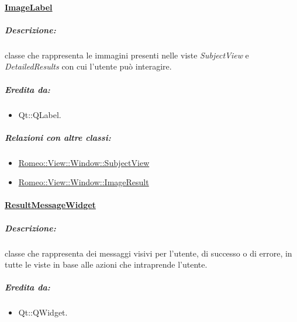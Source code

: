 	\paragraph{\underline{ImageLabel}}
			\label{nav} 
				\subparagraph{Descrizione:} classe che rappresenta le immagini presenti nelle viste \textit{SubjectView} e \textit{DetailedResults} con cui l'utente può interagire.
				
				\subparagraph{Eredita da:}
					\begin{itemize}
					\item Qt::QLabel.
					\end{itemize}
				\subparagraph{Relazioni con altre classi:}
					\begin{itemize}
						\item \hyperref[mainview]{Romeo::View::Window::SubjectView} 
						\item \hyperref[mainview]{Romeo::View::Window::ImageResult} 
					\end{itemize}
					
	\paragraph{\underline{ResultMessageWidget}}
				\label{nav} 
					\subparagraph{Descrizione:} classe che rappresenta dei messaggi visivi per l'utente, di successo o di errore, in tutte le viste in base alle azioni che intraprende l'utente.
					
					\subparagraph{Eredita da:}
						\begin{itemize}
						\item Qt::QWidget.
						\end{itemize}
